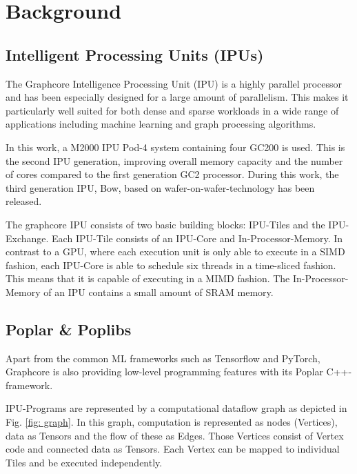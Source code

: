 \documentclass[a4paper,UKenglish,cleveref, autoref, thm-restate]{oasics-v2021}
\begin{document}
\section{Background}

\subsection{Intelligent Processing Units (IPUs)}
The Graphcore Intelligence Processing Unit (IPU) is a highly parallel processor and  has been especially designed for a large amount of parallelism. This makes it 
particularly well suited for both dense and sparse workloads in a wide range of applications including machine learning and graph processing algorithms.

In this work, a M2000 IPU Pod-4 system containing four GC200 is used. This is the second IPU generation, improving overall memory capacity and the number of cores compared to the first generation GC2 processor. During this work, the third generation IPU, Bow, based on wafer-on-wafer-technology has been released.

The graphcore IPU consists of two basic building blocks: IPU-Tiles and the IPU-Exchange. Each IPU-Tile consists of an IPU-Core and In-Processor-Memory. In contrast to a GPU, where each execution unit is only able to execute in a SIMD fashion, each IPU-Core is able to schedule six threads in a time-sliced fashion. This means that it is capable of executing in a MIMD fashion. The In-Processor-Memory of an IPU contains a small amount of SRAM memory.

\subsection{Poplar \& Poplibs}
Apart from the common ML frameworks such as Tensorflow and PyTorch, Graphcore is also providing low-level programming features with its Poplar C++-framework.

IPU-Programs are represented by a computational dataflow graph as depicted in Fig. \ref{fig: graph}. In this graph, computation is represented as nodes (Vertices), data as Tensors and the flow of these as Edges. Those Vertices consist of Vertex code and connected data as Tensors. Each Vertex can be mapped to individual Tiles and be executed independently.
\end{document}
